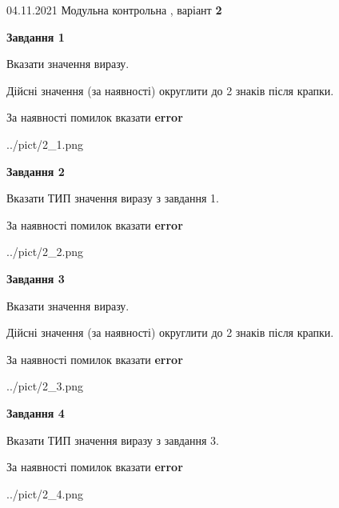\documentclass[11pt, ukrainian]{article}
\begin{document}
{04.11.2021 Модульна контрольна , варіант  \No \textbf { 2 }\par}
{
\begin {large}
{\begin {center}\textbf{Завдання 1}\end {center}}\par
Вказати значення виразу. \par
Дійсні значення (за наявності) округлити до 2 знаків після крапки. \par
За наявності помилок вказати \textbf{error}

\begin{center}
	{../pict/2_1.png}
\end{center}
\newpage

{\begin {center}\textbf{Завдання 2}\end {center}}\par
Вказати ТИП значення виразу з завдання 1. \par
За наявності помилок вказати \textbf{error}

\begin{center}
	{../pict/2_2.png}
\end{center}
\newpage

{\begin {center}\textbf{Завдання 3}\end {center}}\par
Вказати значення виразу. \par
Дійсні значення (за наявності) округлити до 2 знаків після крапки. \par
За наявності помилок вказати \textbf{error}

\begin{center}
	{../pict/2_3.png}
\end{center}
\newpage

{\begin {center}\textbf{Завдання 4}\end {center}}\par
Вказати ТИП значення виразу з завдання 3. \par
За наявності помилок вказати \textbf{error}

\begin{center}
	{../pict/2_4.png}
\end{center}
\newpage


\end{large}}
\end{document}

